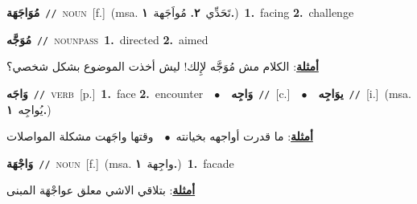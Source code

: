 \documentclass[10pt,a4paper,twoside]{article} %
\begin{document}
\begin{multicols}{2}
{\setlength\topsep{0pt}\textbf{\foreignlanguage{arabic}{مُوَاجَهَة}}\ {\color{gray}\texttt{//}\color{black}}\ \textsc{noun}\ [f.]\ \color{gray}(msa. \foreignlanguage{arabic}{تَحَدِّي}~\foreignlanguage{arabic}{\textbf{٢.}}  \foreignlanguage{arabic}{مُواَجَهة}~\foreignlanguage{arabic}{\textbf{١.}})\color{black}\ \textbf{1.}~facing  \textbf{2.}~challenge\ } \vspace{2mm}

{\setlength\topsep{0pt}\textbf{\foreignlanguage{arabic}{مُوَجَّه}}\ {\color{gray}\texttt{//}\color{black}}\ \textsc{noun\textunderscore pass}\ \textbf{1.}~directed  \textbf{2.}~aimed\  \begin{flushright}\color{gray}\foreignlanguage{arabic}{\textbf{\underline{\foreignlanguage{arabic}{أمثلة}}}: الكلام مش مُوَجَّه لإِلك! ليش أخذت الموضوع بشكل شخصي؟}\end{flushright}\color{black}} \vspace{2mm}

{\setlength\topsep{0pt}\textbf{\foreignlanguage{arabic}{وَاجَه}}\ {\color{gray}\texttt{//}\color{black}}\ \textsc{verb}\ [p.]\ \textbf{1.}~face  \textbf{2.}~encounter\ \ $\bullet$\ \ \setlength\topsep{0pt}\textbf{\foreignlanguage{arabic}{وَاجِه}}\ {\color{gray}\texttt{//}\color{black}}\ [c.]\ \ $\bullet$\ \ \setlength\topsep{0pt}\textbf{\foreignlanguage{arabic}{يوَاجِه}}\ {\color{gray}\texttt{//}\color{black}}\ [i.]\ \color{gray}(msa. \foreignlanguage{arabic}{يُواجِه}~\foreignlanguage{arabic}{\textbf{١.}})\color{black}\  \begin{flushright}\color{gray}\foreignlanguage{arabic}{\textbf{\underline{\foreignlanguage{arabic}{أمثلة}}}: ما قدرت أواجهه بخيانته\ $\bullet$\ \  وقتها واجَهت مشكلة المواصلات}\end{flushright}\color{black}} \vspace{2mm}

{\setlength\topsep{0pt}\textbf{\foreignlanguage{arabic}{وَاجْهَة}}\ {\color{gray}\texttt{//}\color{black}}\ \textsc{noun}\ [f.]\ \color{gray}(msa. \foreignlanguage{arabic}{واجِهة}~\foreignlanguage{arabic}{\textbf{١.}})\color{black}\ \textbf{1.}~facade\  \begin{flushright}\color{gray}\foreignlanguage{arabic}{\textbf{\underline{\foreignlanguage{arabic}{أمثلة}}}: بتلاقي الاشي معلق عواجْهَة المبنى}\end{flushright}\color{black}} \vspace{2mm}


\end{multicols}
\end{document}

